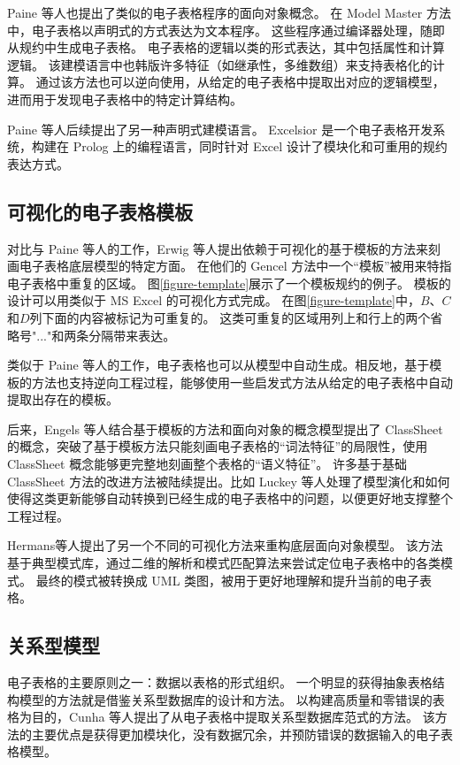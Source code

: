 Paine 等人\cite{ireson1997model,paine2008ensuring}也提出了类似的电子表格程序的面向对象概念。
在 Model Master 方法中，电子表格以声明式的方式表达为文本程序。
这些程序通过编译器处理，随即从规约中生成电子表格。
电子表格的逻辑以类的形式表达，其中包括属性和计算逻辑。
该建模语言中也韩版许多特征（如继承性，多维数组）来支持表格化的计算。
通过该方法也可以逆向使用，从给定的电子表格中提取出对应的逻辑模型，进而用于发现电子表格中的特定计算结构\cite{paine2008spreadsheet}。

Paine 等人\cite{paine2005bringing,paine2008rapid}后续提出了另一种声明式建模语言。
Excelsior 是一个电子表格开发系统，构建在 Prolog 上的编程语言，同时针对 Excel 设计了模块化和可重用的规约表达方式。



\subsection{可视化的电子表格模板}
对比与 Paine 等人的工作，Erwig 等人\cite{erwig2004gencel,erwig2005automatic,abraham2005goal}提出依赖于可视化的基于模板的方法来刻画电子表格底层模型的特定方面。
在他们的 Gencel 方法中一个“模板”被用来特指电子表格中重复的区域。
图\ref{figure-template}展示了一个模板规约的例子。
模板的设计可以用类似于 MS Excel 的可视化方式完成。
在图\ref{figure-template}中，$B$、$C$和$D$列下面的内容被标记为可重复的。
这类可重复的区域用列上和行上的两个省略号"..."和两条分隔带来表达。

类似于 Paine 等人的工作，电子表格也可以从模型中自动生成。相反地，基于模板的方法也支持逆向工程过程，能够使用一些启发式方法从给定的电子表格中自动提取出存在的模板\cite{abraham2006inferring}。

后来，Engels 等人\cite{engels2005classsheets,cunha2010automatically}结合基于模板的方法和面向对象的概念模型提出了 ClassSheet 的概念，突破了基于模板方法只能刻画电子表格的“词法特征”的局限性，使用 ClassSheet 概念能够更完整地刻画整个表格的“语义特征”。
许多基于基础 ClassSheet 方法的改进方法被陆续提出\cite{luckey2012systematic,cunha2011type,cunha2011embedding,cunha2012bidirectional}。比如 Luckey 等人\cite{luckey2012systematic}处理了模型演化和如何使得这类更新能够自动转换到已经生成的电子表格中的问题，以便更好地支撑整个工程过程。

Hermans等人\cite{hermans2010automatically}提出了另一个不同的可视化方法来重构底层面向对象模型。
该方法基于典型模式库，通过二维的解析和模式匹配算法来尝试定位电子表格中的各类模式。
最终的模式被转换成 UML 类图，被用于更好地理解和提升当前的电子表格。

\subsection{关系型模型}
电子表格的主要原则之一：数据以表格的形式组织。
一个明显的获得抽象表格结构模型的方法就是借鉴关系型数据库的设计和方法。
以构建高质量和零错误的表格为目的，Cunha 等人\cite{cunha2009spreadsheets}提出了从电子表格中提取关系型数据库范式的方法。
该方法的主要优点是获得更加模块化，没有数据冗余，并预防错误的数据输入的电子表格模型\cite{cunha2009discovery,cunha2012relational}。


